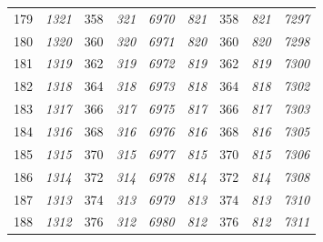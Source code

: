 \documentclass[10pt,fleqn]{article}
\begin{document}
\begin{longtable}{c|cccccccc}
179 & {\color{blue} \it 1321 \rm} & {\color{black} 358} & {\color{blue} \it 321 \rm} & {\color{blue} \it 6970 \rm} & {\color{blue} \it 821 \rm} & {\color{black} 358} & {\color{blue} \it 821 \rm} & {\color{blue} \it 7297 \rm} \\
180 & {\color{blue} \it 1320 \rm} & {\color{black} 360} & {\color{blue} \it 320 \rm} & {\color{blue} \it 6971 \rm} & {\color{blue} \it 820 \rm} & {\color{black} 360} & {\color{blue} \it 820 \rm} & {\color{blue} \it 7298 \rm} \\
181 & {\color{blue} \it 1319 \rm} & {\color{black} 362} & {\color{blue} \it 319 \rm} & {\color{blue} \it 6972 \rm} & {\color{blue} \it 819 \rm} & {\color{black} 362} & {\color{blue} \it 819 \rm} & {\color{blue} \it 7300 \rm} \\
182 & {\color{blue} \it 1318 \rm} & {\color{black} 364} & {\color{blue} \it 318 \rm} & {\color{blue} \it 6973 \rm} & {\color{blue} \it 818 \rm} & {\color{black} 364} & {\color{blue} \it 818 \rm} & {\color{blue} \it 7302 \rm} \\
183 & {\color{blue} \it 1317 \rm} & {\color{black} 366} & {\color{blue} \it 317 \rm} & {\color{blue} \it 6975 \rm} & {\color{blue} \it 817 \rm} & {\color{black} 366} & {\color{blue} \it 817 \rm} & {\color{blue} \it 7303 \rm} \\
184 & {\color{blue} \it 1316 \rm} & {\color{black} 368} & {\color{blue} \it 316 \rm} & {\color{blue} \it 6976 \rm} & {\color{blue} \it 816 \rm} & {\color{black} 368} & {\color{blue} \it 816 \rm} & {\color{blue} \it 7305 \rm} \\
185 & {\color{blue} \it 1315 \rm} & {\color{black} 370} & {\color{blue} \it 315 \rm} & {\color{blue} \it 6977 \rm} & {\color{blue} \it 815 \rm} & {\color{black} 370} & {\color{blue} \it 815 \rm} & {\color{blue} \it 7306 \rm} \\
186 & {\color{blue} \it 1314 \rm} & {\color{black} 372} & {\color{blue} \it 314 \rm} & {\color{blue} \it 6978 \rm} & {\color{blue} \it 814 \rm} & {\color{black} 372} & {\color{blue} \it 814 \rm} & {\color{blue} \it 7308 \rm} \\
187 & {\color{blue} \it 1313 \rm} & {\color{black} 374} & {\color{blue} \it 313 \rm} & {\color{blue} \it 6979 \rm} & {\color{blue} \it 813 \rm} & {\color{black} 374} & {\color{blue} \it 813 \rm} & {\color{blue} \it 7310 \rm} \\
188 & {\color{blue} \it 1312 \rm} & {\color{black} 376} & {\color{blue} \it 312 \rm} & {\color{blue} \it 6980 \rm} & {\color{blue} \it 812 \rm} & {\color{black} 376} & {\color{blue} \it 812 \rm} & {\color{blue} \it 7311 \rm} \\

\end{longtable}
\end{document}
